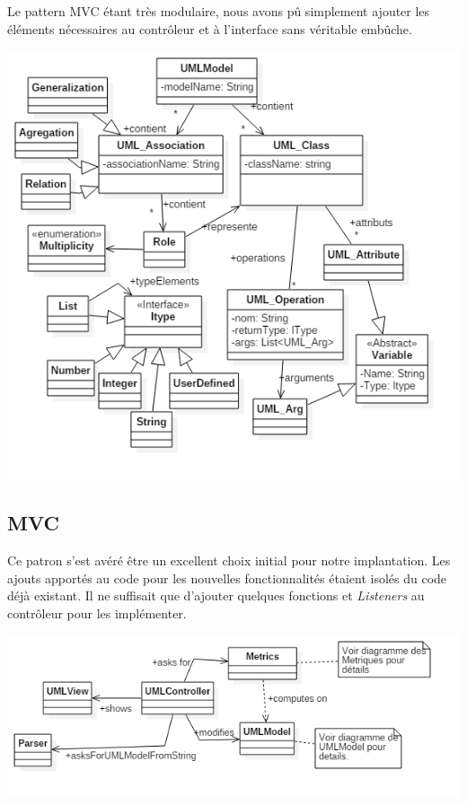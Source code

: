 \documentclass[letter,french]{report}
\begin{document}
  Le pattern MVC étant très modulaire, nous avons pû simplement ajouter les
  éléments nécessaires au contrôleur et à l'interface sans véritable embûche.

	\includegraphics[scale=.5]{images/UML_diagram.png}

	\subsection*{MVC}
  Ce patron s'est avéré être un excellent choix initial pour notre implantation.
  Les ajouts apportés au code pour les nouvelles fonctionnalités étaient isolés
  du code déjà existant. Il ne suffisait que d'ajouter quelques fonctions et
  \emph{Listeners} au contrôleur pour les implémenter.

	\includegraphics[scale=.5]{images/MVC_diagram.png}
	
\end{document}

